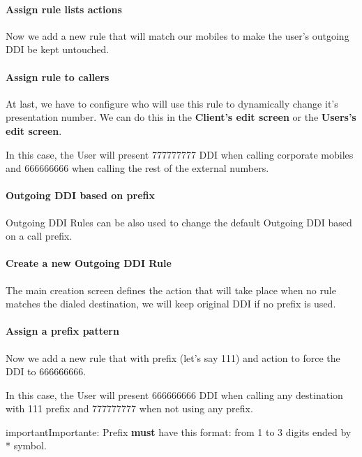 \documentclass[letterpaper,10pt,spanish]{sphinxmanual}
\begin{document}
\paragraph{Assign rule lists actions}

Now we add a new rule that will match our mobiles to make the user's outgoing
DDI be kept untouched.
\paragraph{Assign rule to callers}

At last, we have to configure who will use this rule to dynamically change it's
presentation number. We can do this in the \textbf{Client's edit screen} or the
\textbf{Users's edit screen}.

In this case, the User will present 777777777 DDI when calling corporate mobiles
and 666666666 when calling the rest of the external numbers.


\paragraph{Outgoing DDI based on prefix}
\label{administration_portal/client/vpbx/user_configuration/outgoing_ddi_rules:outgoing-ddi-based-on-prefix}
Outgoing DDI Rules can be also used to change the default Outgoing DDI based on
a call prefix.
\paragraph{Create a new Outgoing DDI Rule}

The main creation screen defines the action that will take place when no rule
matches the dialed destination, we will keep original DDI if no prefix is used.
\paragraph{Assign a prefix pattern}

Now we add a new rule that with prefix (let's say 111) and action to force
the DDI to 666666666.

In this case, the User will present 666666666 DDI when calling any destination
with 111 prefix and 777777777 when not using any prefix.

\begin{notice}{important}{Importante:}
Prefix \textbf{must} have this format: from 1 to 3 digits ended by * symbol.
\end{notice}
\end{document}
